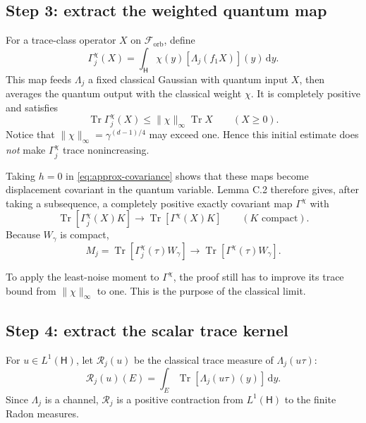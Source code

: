 \documentclass[11pt]{article}
\newcommand{\Hc}{\mathsf H}
\newcommand{\F}{\mathcal F_{\mathrm{orb}}}
\newcommand{\Tr}{\operatorname{Tr}}
\newcommand{\dd}{\,\mathrm d}
\begin{document}
\subsection*{Step 3: extract the weighted quantum map}

For a trace-class operator $X$ on $\F$, define
\begin{equation}\label{eq:Gamma-j}
  \Gamma_j^\chi(X)
  =\int_{\Hc}\chi(y)[\Lambda_j(f_1X)](y)\dd y.
\end{equation}
This map feeds $\Lambda_j$ a fixed classical Gaussian with quantum input
$X$, then averages the quantum output with the classical weight $\chi$.
It is completely positive and satisfies
\[
  \Tr\Gamma_j^\chi(X)
  \leq\|\chi\|_\infty\Tr X
  \qquad(X\geq0).
\]
Notice that $\|\chi\|_\infty=\gamma^{(d-1)/4}$ may exceed one.  Hence this
initial estimate does \emph{not} make $\Gamma_j^\chi$ trace nonincreasing.

Taking $h=0$ in \eqref{eq:approx-covariance} shows that these maps become
displacement covariant in the quantum variable.  Lemma C.2 therefore gives,
after taking a subsequence, a completely positive exactly covariant map
$\Gamma^\chi$ with
\begin{equation}\label{eq:quantum-limit}
  \Tr[\Gamma_j^\chi(X)K]
  \longrightarrow\Tr[\Gamma^\chi(X)K]
  \qquad(K\text{ compact}).
\end{equation}
Because $W_\gamma$ is compact,
\begin{equation}\label{eq:M-limit}
  M_j=\Tr[\Gamma_j^\chi(\tau)W_\gamma]
  \longrightarrow\Tr[\Gamma^\chi(\tau)W_\gamma].
\end{equation}

To apply the least-noise moment to $\Gamma^\chi$, the proof still has to
improve its trace bound from $\|\chi\|_\infty$ to one.  This is the purpose
of the classical limit.

\subsection*{Step 4: extract the scalar trace kernel}

For $u\in L^1(\Hc)$, let $\mathcal R_j(u)$ be the classical trace measure of
$\Lambda_j(u\tau)$:
\begin{equation}\label{eq:Rj}
  \mathcal R_j(u)(E)
  =\int_E\Tr[\Lambda_j(u\tau)(y)]\dd y.
\end{equation}
Since $\Lambda_j$ is a channel, $\mathcal R_j$ is a positive contraction
from $L^1(\Hc)$ to the finite Radon measures.
\end{document}
